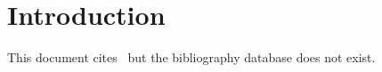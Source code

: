 \documentclass{article}
\begin{document}
\section{Introduction}

This document cites~\cite{somekey} but the bibliography database does not exist.



\end{document}
